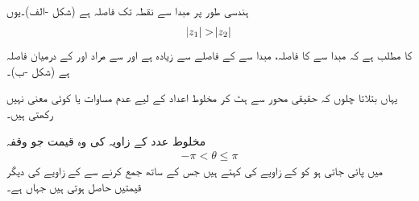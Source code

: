 ہندسی طور پر مبدا  سے نقطہ  تک فاصلہ  ہے (شکل -الف)۔یوں
\begin{align*}
\abs{z_1}>\abs{z_2}
\end{align*}
کا مطلب ہے کہ مبدا سے  کا فاصلہ، مبدا سے  کے فاصلے سے زیادہ ہے اور  سے مراد  اور  کے درمیان فاصلہ ہے  (شکل -ب)۔

یہاں بتلاتا چلوں کہ حقیقی محور سے ہٹ کر  مخلوط اعداد کے لیے عدم مساوات  یا  کوئی معنی نہیں رکھتی ہیں۔

مخلوط عدد کے زاویہ  کی وہ قیمت جو  وقفہ
\begin{align*}
-\pi <\theta \le \pi
\end{align*}
 میں پائی جاتی ہو  کو  کے زاویے کی  کہتے ہیں جس کے ساتھ  جمع  کرنے سے  کے زاویے کی دیگر قیمتیں حاصل ہوتی ہیں جہاں   ہے۔
%
